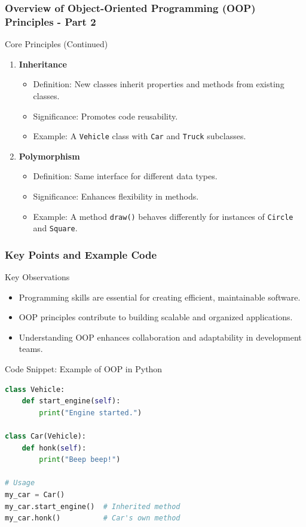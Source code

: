 \documentclass{beamer}
\begin{document}
\begin{frame}[fragile]
    \frametitle{Overview of Object-Oriented Programming (OOP) Principles - Part 2}
    \begin{block}{Core Principles (Continued)}
        \begin{enumerate}[resume]
            \item \textbf{Inheritance}
                \begin{itemize}
                    \item Definition: New classes inherit properties and methods from existing classes.
                    \item Significance: Promotes code reusability.
                    \item Example: A \texttt{Vehicle} class with \texttt{Car} and \texttt{Truck} subclasses.
                \end{itemize}
            \item \textbf{Polymorphism}
                \begin{itemize}
                    \item Definition: Same interface for different data types.
                    \item Significance: Enhances flexibility in methods.
                    \item Example: A method \texttt{draw()} behaves differently for instances of \texttt{Circle} and \texttt{Square}.
                \end{itemize}
        \end{enumerate}
    \end{block}
\end{frame}

\begin{frame}[fragile]
    \frametitle{Key Points and Example Code}
    \begin{block}{Key Observations}
        \begin{itemize}
            \item Programming skills are essential for creating efficient, maintainable software.
            \item OOP principles contribute to building scalable and organized applications.
            \item Understanding OOP enhances collaboration and adaptability in development teams.
        \end{itemize}
    \end{block}
    
    \begin{block}{Code Snippet: Example of OOP in Python}
        \begin{lstlisting}[language=Python]
class Vehicle:
    def start_engine(self):
        print("Engine started.")

class Car(Vehicle):
    def honk(self):
        print("Beep beep!")

# Usage
my_car = Car()
my_car.start_engine()  # Inherited method
my_car.honk()          # Car's own method
        \end{lstlisting}
    \end{block}
\end{frame}
\end{document}
